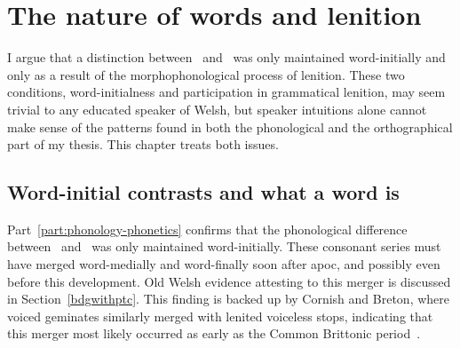 \chapter{The nature of words and lenition}
\label{cha:some-phon-issu}
I argue that a distinction between \lT\ and \xD\ was only maintained word-initially and only as a result of the morphophonological process of lenition. These two conditions, word-initialness and participation in grammatical lenition, may seem trivial to any educated speaker of Welsh, but speaker intuitions alone cannot  make sense of the patterns found in both the phonological and the orthographical part of my thesis. This chapter treats both issues.

\section{Word-initial contrasts and what a word is}
\label{sec:excl-word-init}
Part~\ref{part:phonology-phonetics} confirms that the phonological difference between \lT\ and \xD\ was only maintained word-initially. These consonant series must have merged word-medially and word-finally soon after \gls{apoc}, and possibly even before this development. Old Welsh evidence attesting to this merger is discussed in Section~\ref{bdgwithptc}. This finding is backed up by Cornish and Breton, where voiced geminates similarly merged with lenited voiceless stops, indicating that this merger most likely occurred as early as the Common Brittonic period~\autocite[31]{schrijver_old_2011}.


